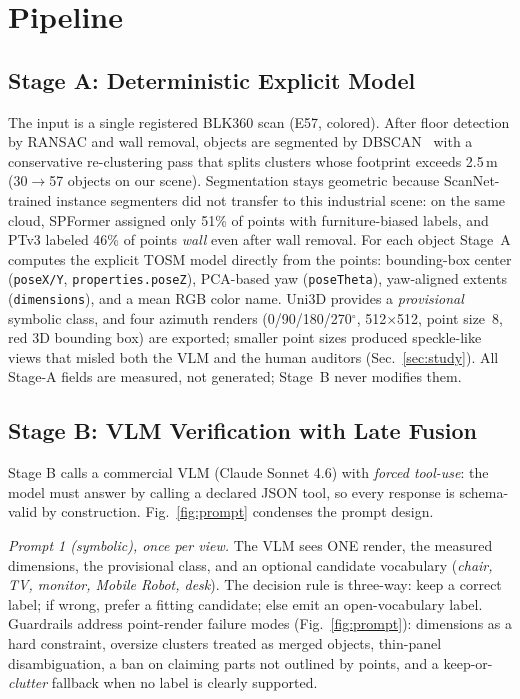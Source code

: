 \documentclass[conference]{IEEEtran}
\begin{document}
\section{Pipeline}

\subsection{Stage A: Deterministic Explicit Model}
The input is a single registered BLK360 scan (E57, colored). After floor
detection by RANSAC and wall removal, objects are segmented by DBSCAN~\cite{ester1996} with a
conservative re-clustering pass that splits clusters whose footprint exceeds
2.5\,m (30$\rightarrow$57 objects on our scene). Segmentation stays
geometric because ScanNet-trained instance segmenters did not transfer to
this industrial scene: on the same cloud, SPFormer assigned only 51\% of
points with furniture-biased labels, and PTv3 labeled 46\% of points
\emph{wall} even after wall removal. For each object Stage~A
computes the explicit TOSM model directly from the points: bounding-box
center (\texttt{poseX/Y}, \texttt{properties.poseZ}), PCA-based yaw
(\texttt{poseTheta}), yaw-aligned extents (\texttt{dimensions}), and a mean
RGB color name. Uni3D provides a \emph{provisional} symbolic class, and four
azimuth renders (0/90/180/270$^{\circ}$, 512$\times$512, point size~8, red
3D bounding box) are exported; smaller point sizes produced speckle-like
views that misled both the VLM and the human auditors
(Sec.~\ref{sec:study}). All Stage-A fields are measured, not generated;
Stage~B never modifies them.

\subsection{Stage B: VLM Verification with Late Fusion}
\label{sec:stageb}
Stage B calls a commercial VLM (Claude Sonnet 4.6) with \emph{forced
tool-use}: the model must answer by calling a declared JSON tool, so every
response is schema-valid by construction. Fig.~\ref{fig:prompt} condenses
the prompt design.

\emph{Prompt 1 (symbolic), once per view.} The VLM sees ONE render, the
measured dimensions, the provisional class, and an optional candidate
vocabulary (\emph{chair, TV, monitor, Mobile Robot, desk}). The decision
rule is three-way: keep a correct label; if wrong, prefer a fitting
candidate; else emit an open-vocabulary label. Guardrails address
point-render failure modes (Fig.~\ref{fig:prompt}): dimensions as a hard
constraint, oversize clusters treated as merged objects, thin-panel
disambiguation, a ban on claiming parts not outlined by points, and a
keep-or-\emph{clutter} fallback when no label is clearly supported.
\end{document}
